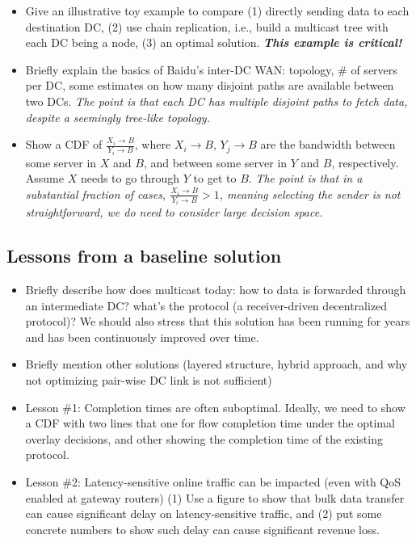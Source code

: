 \begin{itemize}

\item Give an illustrative toy example to compare (1) directly sending data to each destination DC, (2) use chain replication, i.e., build a multicast tree with each DC being a node, (3) an optimal solution. 
{\em\bf This example is critical!}

\item Briefly explain the basics of Baidu's inter-DC WAN: topology, \# of servers per DC, some estimates on how many disjoint paths are available between two DCs.
{\em The point is that each DC has multiple disjoint paths to fetch data, despite a seemingly tree-like topology.}

\item Show a CDF of $\frac{X_i\rightarrow B}{Y_i\rightarrow B}$, where $X_i\rightarrow B$, $Y_j\rightarrow B$ are the bandwidth between some server in $X$ and $B$, and between some server in $Y$ and $B$, respectively. Assume $X$ needs to go through $Y$ to get to $B$.
{\em The point is that in a substantial fraction of cases, $\frac{X_i\rightarrow B}{Y_i\rightarrow B}>1$, meaning selecting the sender is not straightforward, we do need to consider large decision space.}

\end{itemize}

\subsection{Lessons from a baseline solution}
\label{subsec:motivation:baseline}
\begin{itemize}

\item Briefly describe how \company does multicast today: how to data is forwarded through an intermediate DC? what's the protocol (a receiver-driven decentralized protocol)?
We should also stress that this solution has been running for \fillme years and has been continuously improved over time.

\item Briefly mention other solutions (layered structure, hybrid approach, and why not optimizing pair-wise DC link is not sufficient)

\item Lesson \#1: Completion times are often suboptimal.
Ideally, we need to show a CDF with two lines that one for flow completion time under the optimal overlay decisions, and other showing the completion time of the existing protocol. 

\item Lesson \#2: Latency-sensitive online traffic can be impacted (even with QoS enabled at gateway routers)
(1) Use a figure to show that bulk data transfer can cause significant delay on latency-sensitive traffic, and (2) put some concrete numbers to show such delay can cause significant revenue loss.

\end{itemize}

